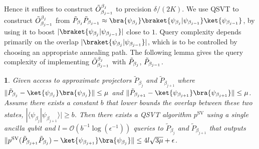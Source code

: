 \documentclass{article}
\theoremstyle{plain}
\newtheorem{lem}{\protect\lemmaname}
\theoremstyle{plain}
\theoremstyle{plain}
\theoremstyle{plain}
\theoremstyle{plain}
\theoremstyle{plain}
\theoremstyle{plain}
\providecommand{\lemmaname}{Lemma}
\newcommand{\calO}{\ensuremath{\mathcal{O}}}
\begin{document}
Hence it suffices to construct $ \Tilde{O}_{\beta_{j-1}}^{\beta_{j}} $ to precision $\delta/(2K)$. We use QSVT to construct  $ \Tilde{O}_{\beta_{j-1}}^{\beta_{j}} $ from $\Tilde{P}_{\beta_j} \Tilde{P}_{\beta_{j-1}} \approx \bra{\psi_{\beta_{j}}} \braket{ \psi_{\beta_j} | \psi_{\beta_{j-1}}  } \ket{\psi_{\beta_{j-1}}}$, by using it to boost
$|\braket{ \psi_{\beta_j} | \psi_{\beta_{j-1}}}|$ close to $1$.
Query complexity depends primarily on the overlap $|\braket{ \psi_{\beta_j} | \psi_{\beta_{j-1}}}|$, which is to be controlled by choosing an appropriate annealing path. The following lemma gives the query complexity of implementing  $ \Tilde{O}_{\beta_{j-1}}^{\beta_{j}} $ with $\Tilde{P}_{\beta_j}$, $\Tilde{P}_{\beta_{j-1}}$.
\begin{lem}
    \label{lem:transop}
    Given access to approximate projectors $\tilde{P}_{\beta_j}$ and $\tilde{P}_{\beta_{j+1}}$ where $\|\tilde{P}_{\beta_j} - \ket{\psi_{\beta_j}} \bra{\psi_{\beta_j}}\| \le \mu$ and $\|\tilde{P}_{\beta_{j+1}} - \ket{\psi_{\beta_{j+1}}} \bra{\psi_{\beta_{j+1}}}\| \le \mu$.
    Assume there exists a constant $b$ that lower bounds the overlap between these two states, $| \langle \psi_{\beta_{j}} | \psi_{\beta_{j+1}} \rangle | \ge b$. 
    Then there exists a QSVT algorithm $p^{\text{SV}}$ using a single ancilla qubit and $l= \calO (b^{-1} \log (\epsilon^{-1}))$ queries to $\tilde{P}_{\beta_j}$ and $\tilde{P}_{\beta_{j+1}}$ that outputs $\|p^{\text{SV}}(\tilde{P}_{\beta_{j+1}}\tilde{P}_{\beta_j}) - \ket{\psi_{\beta_{j+1}}} \bra{\psi_{\beta_{j}}}\| \le 4l\sqrt{3\mu} + \epsilon$.
\end{lem}
\end{document}
